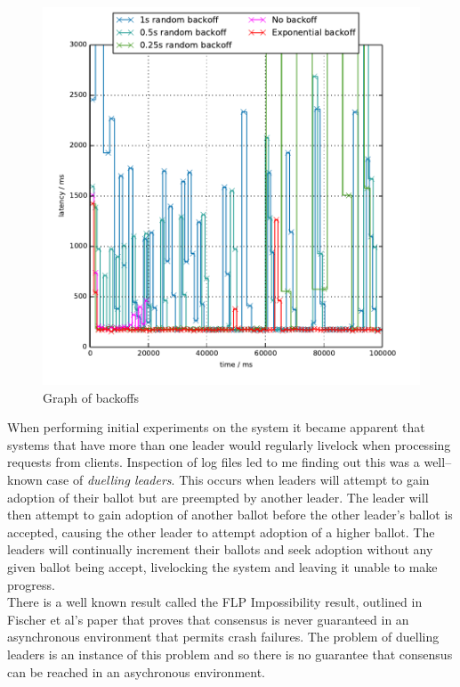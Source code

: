 \begin{figure}
  \includegraphics{include/backoffs.pdf}
  \caption{Graph of backoffs}
  \label{fig:backoff-graph}
\end{figure}

When performing initial experiments on the system it became apparent that systems that have more than one leader would regularly livelock when processing requests from clients. Inspection of log files led to me finding out this was a well--known case of \emph{duelling leaders}. This occurs when leaders will attempt to gain adoption of their ballot but are preempted by another leader. The leader will then attempt to gain adoption of another ballot before the other leader's ballot is accepted, causing the other leader to attempt adoption of a higher ballot. The leaders will continually increment their ballots and seek adoption without any given ballot being accept, livelocking the system and leaving it unable to make progress. \\

There is a well known result called the FLP Impossibility result, outlined in Fischer et al's paper \cite{Fischer:1985:IDC:3149.214121} that proves that consensus is never guaranteed in an asynchronous environment that permits crash failures. The problem of duelling leaders is an instance of this problem and so there is no guarantee that consensus can be reached in an asychronous environment. \\

